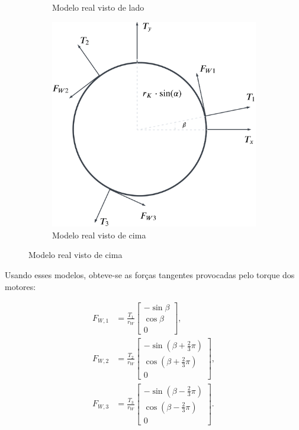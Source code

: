 \begin{figure}[H]
\begin{subfigure}[b]{0.4\textwidth}
        \caption{Modelo real visto de lado}
        \label{fig:torques_lado}
    \end{subfigure}
    \hfill
    \begin{subfigure}[b]{0.4\textwidth}
        \centering
        \includegraphics[width=\linewidth]{Metodologia/Figuras/torque_up.png}
        \caption{Modelo real visto de cima}
        \label{fig:torques_cima}
    \end{subfigure}
\end{figure}

Usando esses modelos, obteve-se as forças tangentes provocadas pelo torque dos motores:

\begin{equation}
    \begin{aligned}
    F_{W,1} &= \frac{T_1}{r_W} 
    \begin{bmatrix}
    -\sin \beta \\
    \cos \beta \\
    0
    \end{bmatrix}, \\
    F_{W,2} &= \frac{T_2}{r_W} 
    \begin{bmatrix}
    -\sin \left( \beta + \frac{2}{3}\pi \right) \\
    \cos \left( \beta + \frac{2}{3}\pi \right) \\
    0
    \end{bmatrix}, \\
    F_{W,3} &= \frac{T_3}{r_W} 
    \begin{bmatrix}
    -\sin \left( \beta - \frac{2}{3}\pi \right) \\
    \cos \left( \beta - \frac{2}{3}\pi \right) \\
    0
    \end{bmatrix}.
    \end{aligned}
\end{equation}

